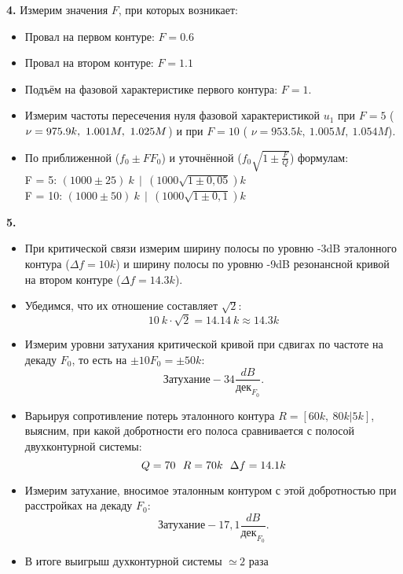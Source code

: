 \textbf{4.} Измерим значения $F$, при которых возникает: 
\begin{itemize}
\item Провал на первом контуре: $F = 0.6$
\item Провал на втором контуре: $F = 1.1$ 
\item Подъём на фазовой характеристике первого контура: $F = 1$.
\item Измерим частоты пересечения нуля фазовой характеристикой $u_1$ при $F = 5$ ($\nu \hm{=} 975.9k,~1.001M,~1.025M$) и при $F = 10$ ( $\nu = 953.5k,~1.005M,~1.054M$). 
\item По приближенной ($ f_0 \pm FF_0 $) и уточнённой ($ f_0\sqrt{1 \pm \frac{F}{Q}} $) формулам: \\
		F = 5: $ (1000 \pm 25) \ k \ \ | \ \ (1000\sqrt{1 \pm 0,05}) k$   \\  
		F = 10: $ (1000 \pm 50) \ k \ \ | \ \ (1000\sqrt{1 \pm 0,1}) k$

\end{itemize}

\newpage
\textbf{5.} 
\begin{itemize}
\item При критической связи измерим ширину полосы по уровню -3dB эталонного контура ($\Delta f = 10k$) и ширину полосы по уровню -9dB резонансной кривой на втором контуре ($\Delta f = 14.3k$). 
\item Убедимся, что их отношение составляет $\sqrt{2}$:\\
 $$ 10 \ k \cdot \sqrt{2} = 14.14 \ k \approx 14.3 k $$

\item Измерим уровни затухания критической кривой при сдвигах по частоте на декаду $F_0$, то есть на $\pm 10F_0 = \pm 50k$:
\[
\textit{Затухание}  -34\frac{dB}{\text{дек}_{F_0}}. 
\]
\item Варьируя сопротивление потерь эталонного контура $R = [60k,~80k|5k]$, выясним, при какой добротности его полоса сравнивается с полосой двухконтурной системы:
 $$
 Q = 70 \ \ R \hm{=} 70k \ \ \Delta f = 14.1k
 $$ 
 \item Измерим затухание, вносимое эталонным контуром с этой добротностью при расстройках на декаду $F_0$: 
 \[
 \textit{Затухание}  -17,1 \frac{dB}{\text{дек}_{F_0}}. 
 \]
 \item В итоге выигрыш духконтурной системы $\simeq~\text{2 раза}$ 

\end{itemize}


